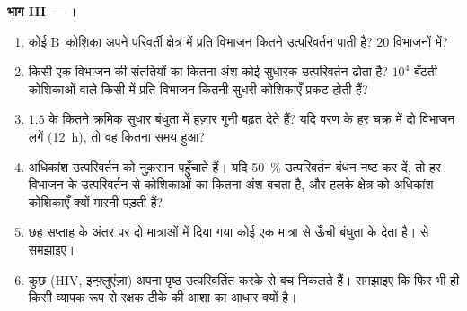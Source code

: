 \begin{problem}
\medskip
\noindent\textbf{भाग III --- ।}
\begin{enumerate}[resume]
  \item कोई B~कोशिका अपने परिवर्ती क्षेत्र में प्रति विभाजन कितने
        उत्परिवर्तन पाती है? $20$ विभाजनों में?
  \item किसी एक विभाजन की संततियों का कितना अंश कोई सुधारक उत्परिवर्तन
        ढोता है? $10^{4}$ बँटती कोशिकाओं वाले किसी  में
        प्रति विभाजन कितनी सुधरी कोशिकाएँ प्रकट होती हैं?
  \item $1.5$ के कितने क्रमिक सुधार बंधुता में हज़ार गुनी बढ़त देते
        हैं? यदि वरण के हर चक्र में दो विभाजन लगें (\qty{12}{h}), तो
        वह कितना समय हुआ?
  \item अधिकांश उत्परिवर्तन  को नुक़सान पहुँचाते हैं। यदि
        \qty{50}{\%} उत्परिवर्तन बंधन नष्ट कर दें, तो हर विभाजन के
        उत्परिवर्तन से कोशिकाओं का कितना अंश बचता है, और हलके क्षेत्र
        को अधिकांश कोशिकाएँ क्यों मारनी पड़ती हैं?
  \item छह सप्ताह के अंतर पर दो मात्राओं में दिया गया कोई  एक
        मात्रा से ऊँची बंधुता के  देता है।  से
        समझाइए।
  \item कुछ  (HIV, इन्फ़्लुएंज़ा) अपना पृष्ठ उत्परिवर्तित करके
         से बच निकलते हैं। समझाइए कि फिर भी  ही
        किसी व्यापक रूप से रक्षक टीके की आशा का आधार क्यों है।
\end{enumerate}


\end{problem}
